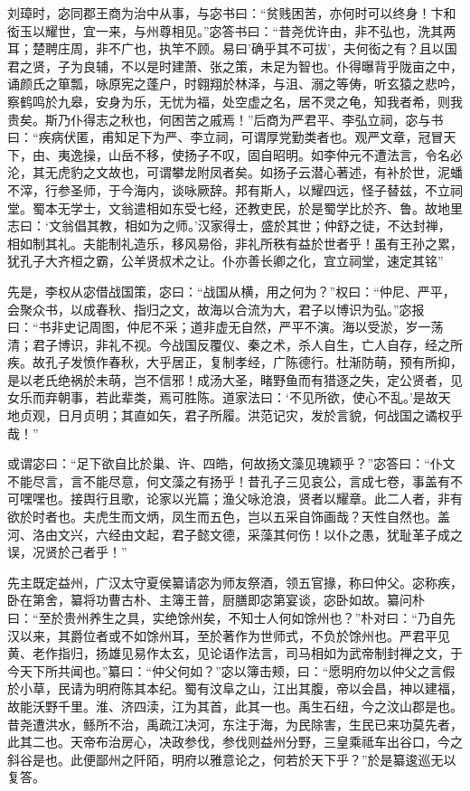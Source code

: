 \documentclass[12pt,UTF8]{ctexbook}
\begin{document}
刘璋时，宓同郡王商为治中从事，与宓书曰：“贫贱困苦，亦何时可以终身！卞和衒玉以耀世，宜一来，与州尊相见。”宓答书曰：“昔尧优许由，非不弘也，洗其两耳；楚聘庄周，非不广也，执竿不顾。易曰'确乎其不可拔'，夫何衒之有？且以国君之贤，子为良辅，不以是时建萧、张之策，未足为智也。仆得曝背乎陇亩之中，诵颜氏之箪瓢，咏原宪之蓬户，时翱翔於林泽，与沮、溺之等俦，听玄猿之悲吟，察鹤鸣於九皋，安身为乐，无忧为福，处空虚之名，居不灵之龟，知我者希，则我贵矣。斯乃仆得志之秋也，何困苦之戚焉！”后商为严君平、李弘立祠，宓与书曰：“疾病伏匿，甫知足下为严、李立祠，可谓厚党勤类者也。观严文章，冠冒天下，由、夷逸操，山岳不移，使扬子不叹，固自昭明。如李仲元不遭法言，令名必沦，其无虎豹之文故也，可谓攀龙附凤者矣。如扬子云潜心著述，有补於世，泥蟠不滓，行参圣师，于今海内，谈咏厥辞。邦有斯人，以耀四远，怪子替兹，不立祠堂。蜀本无学士，文翁遣相如东受七经，还教吏民，於是蜀学比於齐、鲁。故地里志曰：‘文翁倡其教，相如为之师。’汉家得士，盛於其世；仲舒之徒，不达封禅，相如制其礼。夫能制礼造乐，移风易俗，非礼所秩有益於世者乎！虽有王孙之累，犹孔子大齐桓之霸，公羊贤叔术之让。仆亦善长卿之化，宜立祠堂，速定其铭”

先是，李权从宓借战国策，宓曰：“战国从横，用之何为？”权曰：“仲尼、严平，会聚众书，以成春秋、指归之文，故海以合流为大，君子以博识为弘。”宓报曰：“书非史记周图，仲尼不采；道非虚无自然，严平不演。海以受淤，岁一荡清；君子博识，非礼不视。今战国反覆仪、秦之术，杀人自生，亡人自存，经之所疾。故孔子发愤作春秋，大乎居正，复制孝经，广陈德行。杜渐防萌，预有所抑，是以老氏绝祸於未萌，岂不信邪！成汤大圣，睹野鱼而有猎逐之失，定公贤者，见女乐而弃朝事，若此辈类，焉可胜陈。道家法曰：‘不见所欲，使心不乱。’是故天地贞观，日月贞明；其直如矢，君子所履。洪范记灾，发於言貌，何战国之谲权乎哉！”

或谓宓曰：“足下欲自比於巢、许、四皓，何故扬文藻见瑰颖乎？”宓答曰：“仆文不能尽言，言不能尽意，何文藻之有扬乎！昔孔子三见哀公，言成七卷，事盖有不可嘿嘿也。接舆行且歌，论家以光篇；渔父咏沧浪，贤者以耀章。此二人者，非有欲於时者也。夫虎生而文炳，凤生而五色，岂以五采自饰画哉？天性自然也。盖河、洛由文兴，六经由文起，君子懿文德，采藻其何伤！以仆之愚，犹耻革子成之误，况贤於己者乎！”

先主既定益州，广汉太守夏侯纂请宓为师友祭酒，领五官掾，称曰仲父。宓称疾，卧在第舍，纂将功曹古朴、主簿王普，厨膳即宓第宴谈，宓卧如故。纂问朴曰：“至於贵州养生之具，实绝馀州矣，不知士人何如馀州也？”朴对曰：“乃自先汉以来，其爵位者或不如馀州耳，至於著作为世师式，不负於馀州也。严君平见黄、老作指归，扬雄见易作太玄，见论语作法言，司马相如为武帝制封禅之文，于今天下所共闻也。”纂曰：“仲父何如？”宓以簿击颊，曰：“愿明府勿以仲父之言假於小草，民请为明府陈其本纪。蜀有汶阜之山，江出其腹，帝以会昌，神以建福，故能沃野千里。淮、济四渎，江为其首，此其一也。禹生石纽，今之汶山郡是也。昔尧遭洪水，鲧所不治，禹疏江决河，东注于海，为民除害，生民已来功莫先者，此其二也。天帝布治房心，决政参伐，参伐则益州分野，三皇乘祗车出谷口，今之斜谷是也。此便鄙州之阡陌，明府以雅意论之，何若於天下乎？”於是纂逡巡无以复答。
\end{document}
